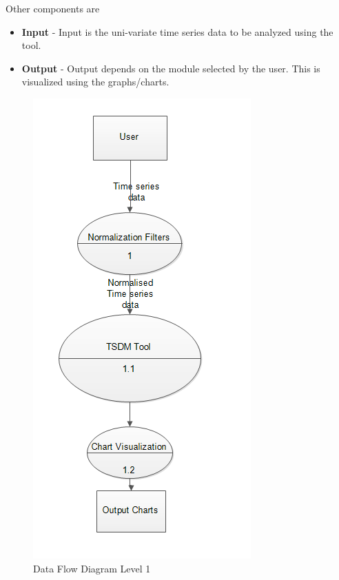 \documentclass[12pt,a4paper]{report}
\begin{document}
\noindent
Other components are 
\begin{itemize}
\item \textbf{Input } - Input is the uni-variate time series data to be analyzed using the tool.
\item \textbf{Output } - Output depends on the module selected by the user. This is visualized using the graphs/charts.
\end{itemize}
\begin{figure}[h!]
	\centering
		\includegraphics[scale=0.85]{screenshots/dfd_1.png}
		\caption{Data Flow Diagram Level 1}
\end{figure}
\end{document}
